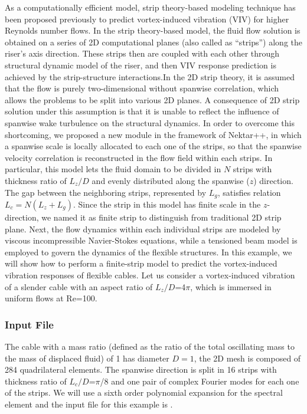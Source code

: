 As a computationally efficient model, strip theory-based modeling technique has been proposed previously to predict vortex-induced vibration (VIV) for higher Reynolds number flows. In the strip theory-based model, the fluid flow solution is obtained on a series of 2D computational planes (also called as “strips”) along the riser’s axis direction. These strips then are coupled with each other through structural dynamic model of the riser, and then VIV response prediction is achieved by the strip-structure interactions.In the 2D strip theory, it is assumed that the flow is purely two-dimensional without spanwise correlation, which allows the problems to be split into various 2D planes. A consequence of 2D strip solution under this assumption is that it is unable to reflect the influence of spanwise wake turbulence on the structural dynamics. In order to overcome this shortcoming, we proposed a new module in the framework of Nektar++, in which a spanwise scale is locally allocated to each one of the strips, so that the spanwise velocity correlation is reconstructed in the flow field within each strips. In particular, this model lets the fluid domain to be divided in $N$ strips with thickness ratio of $L_{z}/D$ and evenly distributed along the spanwise ($z$) direction. The gap between the neighboring strips, represented by $L_{g}$, satisfies relation $L_{c}=N(L_{z}+L_{g})$. Since the strip in this model has finite scale in the $z$-direction, we named it as finite strip to distinguish from traditional 2D strip plane. Next, the flow dynamics within each individual strips are modeled by viscous incompressible Navier-Stokes equations, while a tensioned beam model is employed to govern the dynamics of the flexible structures. In this example, we will show how to perform a finite-strip model to predict the vortex-induced vibration responses of flexible cables. Let us consider a vortex-induced vibration of a slender cable with an aspect ratio of $L_z/D$=4$\pi$, which is immersed in uniform flows at Re=100.

\subsubsection{Input File}

The cable with a mass ratio (defined as the ratio of the total oscillating mass to the mass of displaced fluid) of 1 has diameter $D=1$, the 2D mesh is composed of 284 quadrilateral elements. The spanwise direction is split in 16 strips with thickness ratio of $L_c/D$=$\pi$/8 and one pair of complex Fourier modes for each one of the strips. We will use a sixth order polynomial expansion for the spectral element and the input file for this example is .



